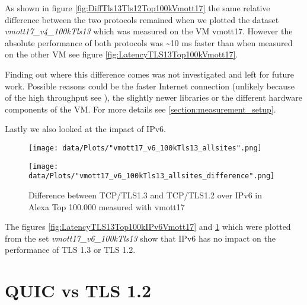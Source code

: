 As shown in figure \ref{fig:DiffTls13Tls12Top100kVmott17} the same relative difference between the two protocols remained when we plotted the dataset \textit{vmott17\_v4\_100kTls13} which was measured on the VM vmott17.
However the absolute performance of both protocols was \textasciitilde 10 ms faster than when measured on the other VM see figure \ref{fig:LatencyTLS13Top100kVmott17}.

Finding out where this difference comes was not investigated and left for future work.
Possible reasons could be the faster Internet connection (unlikely because of the high throughput see \cite{DBLP:conf/imc/SundaresanFTM13}), the slightly newer libraries or the different hardware components of the VM.
For more details see \ref{section:measurement_setup}.


Lastly we also looked at the impact of IPv6.

\begin{figure}[!thb]
	\centering
	\begin{minipage}{.45\textwidth}
		\centering
		\texttt{[image: data/Plots/"vmott17\_v6\_100kTls13\_allsites".png]}
		\caption{Latency of sites in Alexa Top 100.000 that support TLS 1.3 and IPv6 measured with vmott17 }
  		\label{fig:LatencyTLS13Top100kIPv6Vmott17}
  	\end{minipage}%
  	\hspace{0.5cm}
  	\begin{minipage}{.45\textwidth}
  		\centering
  		\texttt{[image: data/Plots/"vmott17\_v6\_100kTls13\_allsites\_difference".png]}
		\caption{Difference between TCP/TLS1.3 and TCP/TLS1.2 over IPv6 in Alexa Top 100.000 measured with vmott17}
  		\label{fig:DiffTls13Tls12Top100kIPv6Vmott17}
  	\end{minipage}
\end{figure}

The figures \ref{fig:LatencyTLS13Top100kIPv6Vmott17} and \ref{fig:DiffTls13Tls12Top100kIPv6Vmott17} which were plotted from the set \textit{vmott17\_v6\_100kTls13} show that IPv6 has no impact on the performance of TLS 1.3 or TLS 1.2.

\section{QUIC vs TLS 1.2}
\label{QUIC_vs_TLS_1.2}

